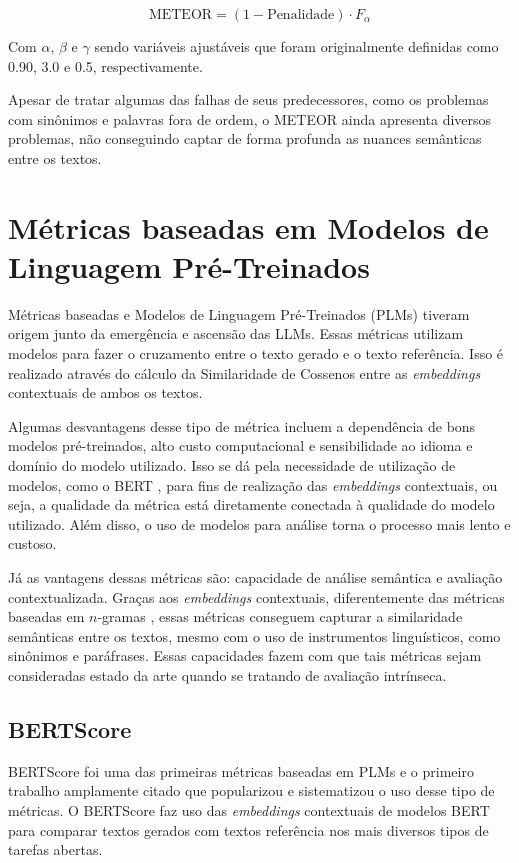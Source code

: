 \documentclass[cic,tc]{iiufrgs}
\begin{document}
\begin{equation}
    \label{eq:METEORval}
    \text{METEOR} = (1 - \text{Penalidade}) \cdot F_{\alpha}
\end{equation}

Com $\alpha$, $\beta$ e $\gamma$ sendo variáveis ajustáveis que foram originalmente definidas como 0.90, 3.0 e 0.5, respectivamente.

Apesar de tratar algumas das falhas de seus predecessores, como os problemas com sinônimos e palavras fora de ordem, o METEOR ainda apresenta diversos problemas, não conseguindo captar de forma profunda as nuances semânticas entre os textos.

\section{Métricas baseadas em Modelos de Linguagem Pré-Treinados}
\label{sec:métricas baseadas em PLMs}
Métricas baseadas e Modelos de Linguagem Pré-Treinados (PLMs) tiveram origem junto da emergência e ascensão das LLMs. Essas métricas utilizam modelos para fazer o cruzamento entre o texto gerado e o texto referência. Isso é realizado através do cálculo da Similaridade de Cossenos entre as \textit{embeddings} contextuais de ambos os textos.

Algumas desvantagens desse tipo de métrica incluem a dependência de bons modelos pré-treinados, alto custo computacional e sensibilidade ao idioma e domínio do modelo utilizado. Isso se dá pela necessidade de utilização de modelos, como o BERT \cite{devlin2019bert}, para fins de realização das \textit{embeddings} contextuais, ou seja, a qualidade da métrica está diretamente conectada à qualidade do modelo utilizado. Além disso, o uso de modelos para análise torna o processo mais lento e custoso.

Já as vantagens dessas métricas são: capacidade de análise semântica e avaliação contextualizada. Graças aos \textit{embeddings} contextuais, diferentemente das métricas baseadas em $n$-gramas \cite{shannon1948mathematical}, essas métricas conseguem capturar a similaridade semânticas entre os textos, mesmo com o uso de instrumentos linguísticos, como sinônimos e paráfrases. Essas capacidades fazem com que tais métricas sejam consideradas estado da arte quando se tratando de avaliação intrínseca.

\subsection{BERTScore}
\label{sec:bert-score}
BERTScore \cite{bert-score} foi uma das primeiras métricas baseadas em PLMs e o primeiro trabalho amplamente citado que popularizou e sistematizou o uso desse tipo de métricas. O BERTScore faz uso das \textit{embeddings} contextuais de modelos BERT para comparar textos gerados com textos referência nos mais diversos tipos de tarefas abertas. 
\end{document}
